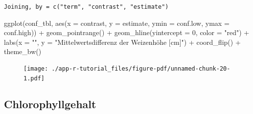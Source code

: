 \documentclass[
  letterpaper,
]{scrbook}
\newenvironment{Shaded}{\begin{snugshade}}{\end{snugshade}}
\newcommand{\AttributeTok}[1]{\textcolor[rgb]{0.40,0.45,0.13}{#1}}
\newcommand{\DecValTok}[1]{\textcolor[rgb]{0.68,0.00,0.00}{#1}}
\newcommand{\FunctionTok}[1]{\textcolor[rgb]{0.28,0.35,0.67}{#1}}
\newcommand{\NormalTok}[1]{\textcolor[rgb]{0.00,0.23,0.31}{#1}}
\newcommand{\SpecialCharTok}[1]{\textcolor[rgb]{0.37,0.37,0.37}{#1}}
\newcommand{\StringTok}[1]{\textcolor[rgb]{0.13,0.47,0.30}{#1}}
\begin{document}
\begin{verbatim}
Joining, by = c("term", "contrast", "estimate")
\end{verbatim}

\begin{Shaded}
\begin{Highlighting}[]
\FunctionTok{ggplot}\NormalTok{(conf\_tbl, }\FunctionTok{aes}\NormalTok{(}\AttributeTok{x =}\NormalTok{ contrast, }\AttributeTok{y =}\NormalTok{ estimate, }
                     \AttributeTok{ymin =}\NormalTok{ conf.low, }\AttributeTok{ymax =}\NormalTok{ conf.high)) }\SpecialCharTok{+}
  \FunctionTok{geom\_pointrange}\NormalTok{() }\SpecialCharTok{+}
  \FunctionTok{geom\_hline}\NormalTok{(}\AttributeTok{yintercept =} \DecValTok{0}\NormalTok{, }\AttributeTok{color =} \StringTok{"red"}\NormalTok{) }\SpecialCharTok{+}
  \FunctionTok{labs}\NormalTok{(}\AttributeTok{x =} \StringTok{""}\NormalTok{, }\AttributeTok{y =} \StringTok{"Mittelwertsdifferenz der Weizenhöhe [cm]"}\NormalTok{) }\SpecialCharTok{+}
  \FunctionTok{coord\_flip}\NormalTok{() }\SpecialCharTok{+}
  \FunctionTok{theme\_bw}\NormalTok{()}
\end{Highlighting}
\end{Shaded}

\begin{figure}[H]

{\centering \texttt{[image: ./app-r-tutorial\_files/figure-pdf/unnamed-chunk-20-1.pdf]}

}

\end{figure}

\hypertarget{chlorophyllgehalt}{%
\subsection{Chlorophyllgehalt}\label{chlorophyllgehalt}}
\end{document}
